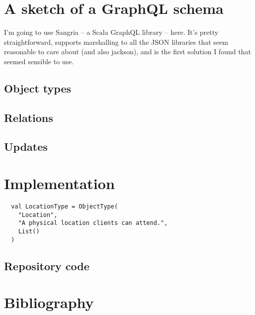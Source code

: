 \documentclass[a4paper]{article}
\begin{document}
\section{A sketch of a GraphQL schema}

I'm going to use Sangria -- a Scala GraphQL library -- here. It's pretty
straightforward, supports marshalling to all the JSON libraries that seem
reasonable to care about (and also jackson), and is the first solution I found
that seemed sensible to use.

\subsection{Object types}

\subsection{Relations}

\subsection{Updates}

\section{Implementation}

\begin{verbatim}
  val LocationType = ObjectType(
    "Location",
    "A physical location clients can attend.",
    List()
  )
\end{verbatim}

\subsection{Repository code}

\section{Bibliography}

\nocite{*}

\printbibliography[heading=none]
\end{document}
